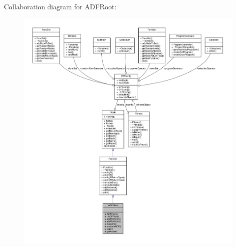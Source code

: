 Collaboration diagram for A\+D\+F\+Root\+:
\nopagebreak
\begin{figure}[H]
\begin{center}
\leavevmode
\includegraphics[width=350pt]{classADFRoot__coll__graph}
\end{center}
\end{figure}
